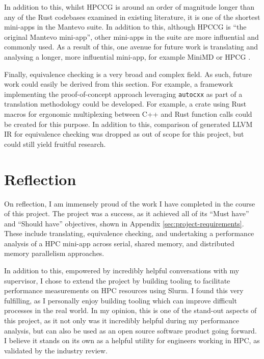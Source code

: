In addition to this, whilst HPCCG is around an order of magnitude longer than any of the Rust codebases examined in existing literature, it is one of the shortest \acrshort{mini-app}s in the Mantevo suite. In addition to this, although HPCCG is ``the original Mantevo mini-app'', other \acrshort{mini-app}s in the suite are more influential and commonly used. As a result of this, one avenue for future work is translating and analysing a longer, more influential \acrshort{mini-app}, for example MiniMD \cite{osti_1231191} or HPCG \cite{dongarra2015hpcg}.

Finally, equivalence checking is a very broad and complex field. As such, future work could easily be derived from this section. For example, a framework implementing the proof-of-concept approach leveraging \texttt{autocxx} as part of a translation methodology could be developed. For example, a crate using Rust macros for ergonomic multiplexing between C++ and Rust function calls could be created for this purpose. In addition to this, comparison of generated LLVM IR for equivalence checking was dropped as out of scope for this project, but could still yield fruitful research.



\section{Reflection}
\label{sec:reflection}

On reflection, I am immensely proud of the work I have completed in the course of this project. The project was a success, as it achieved all of its ``Must have'' and ``Should have'' objectives, shown in Appendix \ref{sec:project-requirements}. These include translating, equivalence checking, and undertaking a performance analysis of a \acrshort{HPC} \acrshort{mini-app} across serial, shared memory, and distributed memory parallelism approaches.

In addition to this, empowered by incredibly helpful conversations with my supervisor, I chose to extend the project by building tooling to facilitate performance measurements on \acrshort{HPC} resources using Slurm. I found this very fulfilling, as I personally enjoy building tooling which can improve difficult processes in the real world. In my opinion, this is one of the stand-out aspects of this project, as it not only was it incredibly helpful during my performance analysis, but can also be used as an open source software product going forward. I believe it stands on its own as a helpful utility for engineers working in \acrshort{HPC}, as validated by the industry review.

